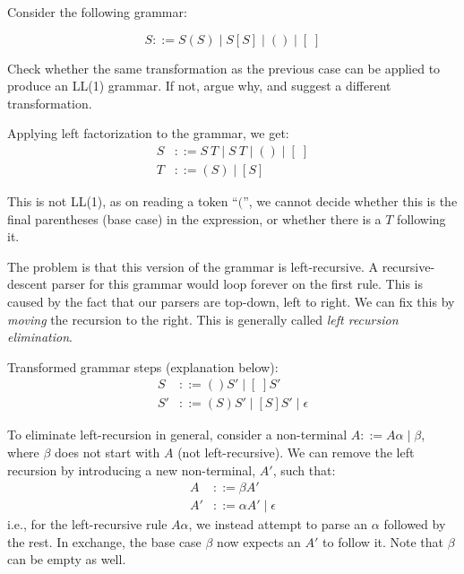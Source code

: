 \begin{exercise}{}
  Consider the following grammar:

  \begin{equation*}
    S ::= S(S) \mid S[S] \mid () \mid [\;]
  \end{equation*}
    
  Check whether the same transformation as the previous case can be applied to
  produce an LL(1) grammar. If not, argue why, and suggest a different
  transformation.

  \begin{solution}
    Applying left factorization to the grammar, we get:
    \begin{align*}
      S &::= S ~T \mid S ~T \mid () \mid [\;] \\
      T &::= (S) \mid [S]
    \end{align*}

    This is not LL(1), as on reading a token ``\((\)'', we cannot decide whether
    this is the final parentheses (base case) in the expression, or whether
    there is a \(T\) following it.

    The problem is that this version of the grammar is left-recursive. A
    recursive-descent parser for this grammar would loop forever on the first
    rule. This is caused by the fact that our parsers are top-down, left to
    right. We can fix this by \emph{moving} the recursion to the right. This is
    generally called \emph{left recursion elimination}.

    Transformed grammar steps (explanation below):
    \begin{align*}
      S &::= ()S' \mid [\;]S' \\
      S' &::= (S)S' \mid [S]S' \mid \epsilon
    \end{align*}

    To eliminate left-recursion in general, consider a non-terminal \(A ::=
    A\alpha \mid \beta\), where \(\beta\) does not start with \(A\) (not
    left-recursive). We can remove the left recursion by introducing a new
    non-terminal, \(A'\), such that:
    \begin{align*}
      A &::= \beta A' \\
      A' &::= \alpha A' \mid \epsilon
    \end{align*}
    i.e., for the left-recursive rule \(A\alpha\), we instead attempt to parse
    an \(\alpha\) followed by the rest. In exchange, the base case \(\beta\) now
    expects an \(A'\) to follow it.
    Note that \(\beta\) can be empty as well.
    

\end{solution}
\end{exercise}
